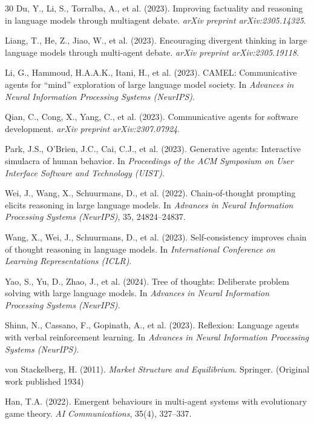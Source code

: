 \documentclass[12pt,a4paper]{article}
\begin{document}
\begin{thebibliography}{30}
Du, Y., Li, S., Torralba, A., et al. (2023). Improving factuality and reasoning in language models through multiagent debate. \textit{arXiv preprint arXiv:2305.14325}.

Liang, T., He, Z., Jiao, W., et al. (2023). Encouraging divergent thinking in large language models through multi-agent debate. \textit{arXiv preprint arXiv:2305.19118}.

Li, G., Hammoud, H.A.A.K., Itani, H., et al. (2023). CAMEL: Communicative agents for ``mind'' exploration of large language model society. In \textit{Advances in Neural Information Processing Systems (NeurIPS)}.

Qian, C., Cong, X., Yang, C., et al. (2023). Communicative agents for software development. \textit{arXiv preprint arXiv:2307.07924}.

Park, J.S., O'Brien, J.C., Cai, C.J., et al. (2023). Generative agents: Interactive simulacra of human behavior. In \textit{Proceedings of the ACM Symposium on User Interface Software and Technology (UIST)}.

Wei, J., Wang, X., Schuurmans, D., et al. (2022). Chain-of-thought prompting elicits reasoning in large language models. In \textit{Advances in Neural Information Processing Systems (NeurIPS)}, 35, 24824--24837.

Wang, X., Wei, J., Schuurmans, D., et al. (2023). Self-consistency improves chain of thought reasoning in language models. In \textit{International Conference on Learning Representations (ICLR)}.

Yao, S., Yu, D., Zhao, J., et al. (2024). Tree of thoughts: Deliberate problem solving with large language models. In \textit{Advances in Neural Information Processing Systems (NeurIPS)}.

Shinn, N., Cassano, F., Gopinath, A., et al. (2023). Reflexion: Language agents with verbal reinforcement learning. In \textit{Advances in Neural Information Processing Systems (NeurIPS)}.

von Stackelberg, H. (2011). \textit{Market Structure and Equilibrium}. Springer. (Original work published 1934)

Han, T.A. (2022). Emergent behaviours in multi-agent systems with evolutionary game theory. \textit{AI Communications}, 35(4), 327--337.


\end{thebibliography}
\end{document}
